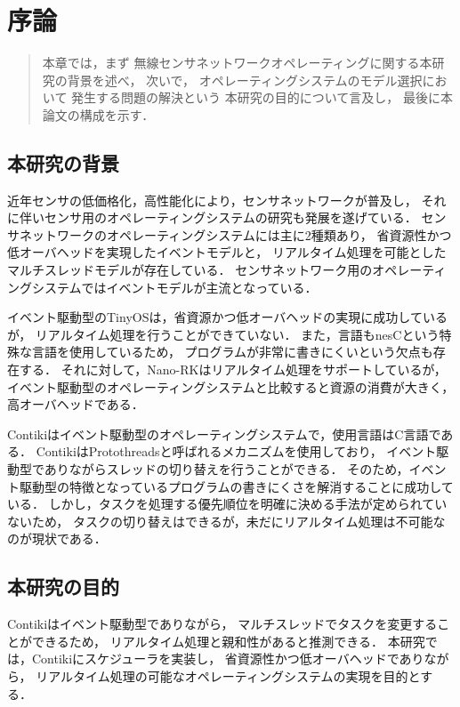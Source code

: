 \chapter{序論}
\begin{large}
\begin{quote}
本章では，まず
無線センサネットワークオペレーティングに関する本研究の背景を述べ，
次いで，
オペレーティングシステムのモデル選択において
発生する問題の解決という
本研究の目的について言及し，
最後に本論文の構成を示す．
\end{quote}
\end{large}
\clearpage

\section{本研究の背景}
近年センサの低価格化，高性能化により，センサネットワークが普及し，
それに伴いセンサ用のオペレーティングシステムの研究も発展を遂げている．
センサネットワークのオペレーティングシステムには主に2種類あり，
省資源性かつ低オーバヘッドを実現したイベントモデルと，
リアルタイム処理を可能としたマルチスレッドモデルが存在している．
センサネットワーク用のオペレーティングシステムではイベントモデルが主流となっている．

イベント駆動型のTinyOSは，省資源かつ低オーバヘッドの実現に成功しているが，
リアルタイム処理を行うことができていない．
また，言語もnesCという特殊な言語を使用しているため，
プログラムが非常に書きにくいという欠点も存在する．
それに対して，Nano-RKはリアルタイム処理をサポートしているが，
イベント駆動型のオペレーティングシステムと比較すると資源の消費が大きく，
高オーバヘッドである．

Contikiはイベント駆動型のオペレーティングシステムで，使用言語はC言語である．
ContikiはProtothreadsと呼ばれるメカニズムを使用しており，
イベント駆動型でありながらスレッドの切り替えを行うことができる．
そのため，イベント駆動型の特徴となっているプログラムの書きにくさを解消することに成功している．
しかし，タスクを処理する優先順位を明確に決める手法が定められていないため，
タスクの切り替えはできるが，未だにリアルタイム処理は不可能なのが現状である．


\section{本研究の目的}
Contikiはイベント駆動型でありながら，
マルチスレッドでタスクを変更することができるため，
リアルタイム処理と親和性があると推測できる．
本研究では，Contikiにスケジューラを実装し，
省資源性かつ低オーバヘッドでありながら，
リアルタイム処理の可能なオペレーティングシステムの実現を目的とする．


